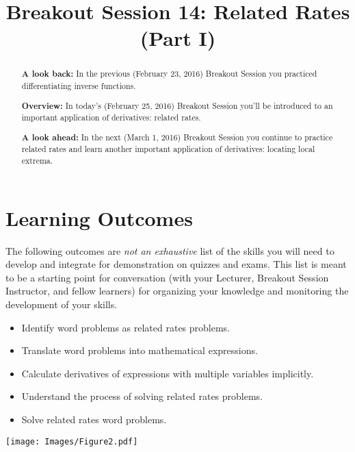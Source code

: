 \documentclass[handout,nooutcomes]{ximera}
\title{Breakout Session 14: Related Rates (Part I)}
\begin{document}
\begin{abstract}
  \textbf{A look back:} In the previous (February 23, 2016) Breakout Session you practiced differentiating inverse functions.

  \textbf{Overview:} In today's (February 25, 2016) Breakout Session you'll be introduced to an important application of derivatives: related rates.
  
  \textbf{A look ahead:} In the next (March 1, 2016) Breakout Session you continue to practice related rates and learn another important application of derivatives: locating local extrema.
\end{abstract}
\maketitle

\section{Learning Outcomes}
\label{section:learning-outcomes}
The following outcomes are \emph{not an exhaustive} list of the skills you will need to develop and integrate for demonstration on quizzes and exams.
This list is meant to be a starting point for conversation (with your Lecturer, Breakout Session Instructor, and fellow learners) for organizing your knowledge and monitoring the development of your skills.

\begin{itemize}
  \item 
    Identify word problems as related rates problems.
  \item 
    Translate word problems into mathematical expressions.
  \item 
    Calculate derivatives of expressions with multiple variables implicitly.
  \item 
    Understand the process of solving related rates problems.
  \item
    Solve related rates word problems.
\end{itemize}
\newpage

\begin{image}
 \texttt{[image: Images/Figure2.pdf]}
\end{image}
\end{document}
